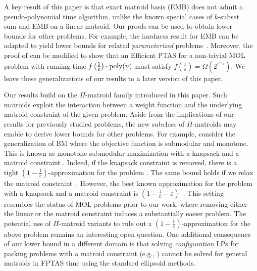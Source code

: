 \documentclass[11pt,letter]{article}
\newcommand{\eps}{{\varepsilon}}
\begin{document}
 A key result of this paper is that {\sc exact matroid basis} (EMB) does not admit a pseudo-polynomial time algorithm, unlike the known special cases of $k$-{\sc subset sum} and EMB on a linear matroid.
  Our proofs can be used to obtain lower bounds for other problems. For example, 
  the hardness result for EMB can be adapted to yield  
  lower bounds for related {\em parameterized} problems~\cite{FGKSS23,doron2023budgeted}.
  Moreover, the proof of  can be modified to show that an  Efficient PTAS for a non-trivial MOL problem with running time $f\left( \frac{1}{\eps}\right)\cdot \textnormal{poly}(n)$ must satisfy $f\left(\frac{1}{\eps} \right)=\Omega\left( 2^{\eps^{-\frac{1}{4}}}\right)$. We leave these generalizations of our results to a later version of this paper.   

 Our results build on the $\Pi$-matroid family introduced in this paper. Such matroids exploit the interaction between a weight function and the underlying matroid constraint of the given problem. Aside from the implications of our results for previously studied problems,
 the new subclass of $\Pi$-matroids may enable to derive lower bounds for 
 other problems. For example, consider the generalization of BM where the objective function is submodular and monotone.
 This is known as monotone submodular maximization with a knapsack and a matroid constraint \cite{chekuri2010dependent}. Indeed, if the knapsack constraint is removed, there is a tight $\left(1-\frac{1}{e} \right)$-approximation for the problem \cite{calinescu2011maximizing}. The same bound holds if we relax the matroid constraint~\cite{sviridenko2004note}. However, the best known approximation for the problem with a knapsack and a matroid constraint
 is $\left(1-\frac{1}{e} -\eps \right)$~\cite{chekuri2010dependent}. This setting resembles the status of MOL problems prior to our work, where removing either the linear or the matroid constraint induces a substantially easier problem. 
 The potential use of $\Pi$-matroid variants to rule out a
 $\left(1-\frac{1}{e} \right)$-approximation for %
 the above problem remains an interesting open question. One additional consequence of our lower bound in a different domain is that solving {\em configuration} LPs for packing problems with a matroid constraint (e.g., \cite{grage2019eptas,doron2023afptas}) cannot be solved for general matroids in FPTAS time using the standard ellipsoid methods. 
 
\end{document}
